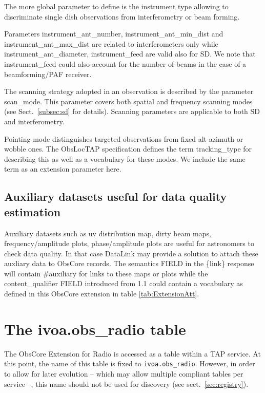 \documentclass[11pt,a4paper]{ivoa}
\begin{document}
The more global parameter to define is the instrument type allowing to discriminate single dish observations from interferometry or beam forming.

Parameters instrument\_ant\_number, instrument\_ant\_min\_dist and instrument\_ant\_max\_dist are related to interferometers only while instrument\_ant\_diameter, instrument\_feed are valid also for SD.
We note that instrument\_feed could also  account for the number of beams in the case of a beamforming/PAF receiver.

The scanning strategy adopted in an observation is described by the parameter scan\_mode. This parameter covers both spatial and frequency scanning modes (see Sect.~\ref{subsec:sd} for details).
Scanning parameters are applicable to both SD and interferometry.

Pointing mode distinguishes targeted observations from  fixed alt-azimuth or wobble ones. The ObsLocTAP specification \citep{2021ivoa.spec.0724S} defines the term tracking\_type for describing this as well as a  vocabulary for these modes. We include the same term as an extension parameter here.


\subsection{Auxiliary datasets useful for data quality estimation}

Auxiliary datasets such as  uv distribution map, dirty beam maps, frequency/amplitude plots, phase/amplitude plots are useful for astronomers to check data quality.
In that case DataLink \citep{2015ivoa.spec.0617D} may provide a solution to attach these auxliary data to ObsCore records. The semantics FIELD in the \{link\} response  will contain \#auxiliary  for links to these maps or plots while  the content\_qualifier FIELD introduced from 1.1  could contain a vocabulary as defined in this ObsCore extension in table \ref{tab:ExtensionAtt}.


\section{The ivoa.obs\_radio table}
\label{sec:implementation}

The ObsCore Extension for Radio is accessed as a table within a TAP
\citep{2019ivoa.spec.0927D} service.  At this
point, the name of this table is fixed to \verb|ivoa.obs_radio|.
However, in order to allow for later evolution -- which may allow
multiple compliant tables per service --, this name should not be used
for discovery (see sect.~\ref{sec:registry}).
\end{document}
